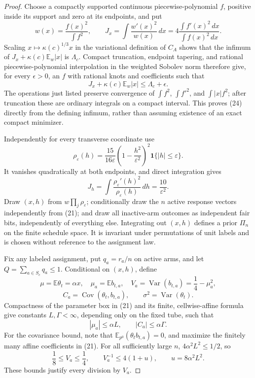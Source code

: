\documentclass{article}
\begin{document}
\begin{proof}
Choose a compactly supported continuous piecewise-polynomial \(f\), positive inside its support and zero at its endpoints, and put
\[
w(x)=\frac{f(x)^2}{\int f^2},
\qquad
J_x=\int\frac{w'(x)^2}{w(x)}\,dx
=4\frac{\int f'(x)^2\,dx}{\int f(x)^2\,dx}.
\]
Scaling \(x\mapsto\kappa(c)^{1/3}x\) in the variational definition of \(C_A\) shows that the infimum of \(J_x+\kappa(c)\mathbb E_w|x|\) is \(\Lambda_c\).  Compact truncation, endpoint tapering, and rational piecewise-polynomial interpolation in the weighted Sobolev norm therefore give, for every \(\epsilon>0\), an \(f\) with rational knots and coefficients such that
\[
J_x+\kappa(c)\mathbb E_w|x|\le\Lambda_c+\epsilon.
\tag{24}
\]
The operations just listed preserve convergence of \(\int f^2\), \(\int f'^2\), and \(\int|x|f^2\); after truncation these are ordinary integrals on a compact interval.  This proves (24) directly from the defining infimum, rather than assuming existence of an exact compact minimizer.

Independently for every transverse coordinate use
\[
\rho_\varepsilon(h)=\frac{15}{16\varepsilon}
\left(1-\frac{h^2}{\varepsilon^2}\right)^2
\mathbf1\{|h|\le\varepsilon\}.
\]
It vanishes quadratically at both endpoints, and direct integration gives
\[
J_h=\int\frac{\rho_\varepsilon'(h)^2}{\rho_\varepsilon(h)}\,dh
=\frac{10}{\varepsilon^2}.
\tag{25}
\]
Draw \((x,h)\) from \(w\prod_j\rho_\varepsilon\); conditionally draw the \(n\) active response vectors independently from (21); and draw all inactive-arm outcomes as independent fair bits, independently of everything else.  Integrating out \((x,h)\) defines a prior \(\Pi_n\) on the finite schedule space.  It is invariant under permutations of unit labels and is chosen without reference to the assignment law.

Fix any labeled assignment, put \(q_a=r_a/n\) on active arms, and let \(Q=\sum_{a\in S_c}q_a\le1\).  Conditional on \((x,h)\), define
\[
\mu=\mathbb E\theta_t=\alpha x,\quad
\mu_a=\mathbb Eb_{t,a},\quad
V_a=\operatorname{Var}(b_{t,a})=\frac14-\mu_a^2,
\]
\[
C_a=\operatorname{Cov}(\theta_t,b_{t,a}),
\qquad
\sigma^2=\operatorname{Var}(\theta_t).
\]
Compactness of the parameter box in (21) and its finite, cellwise-affine formula give constants \(L,\Gamma<\infty\), depending only on the fixed tube, such that
\[
|\mu_a|\le\alpha L,
\qquad
|C_a|\le\alpha\Gamma.
\tag{26}
\]
For the covariance bound, note that \(\mathbb E_{p^0}(\theta_tb_{t,a})=0\), and maximize the finitely many affine coefficients in (21).  For all sufficiently large \(n\), \(4\alpha^2L^2\le1/2\), so
\[
\frac18\le V_a\le\frac14,
\qquad
V_a^{-1}\le4(1+u),
\qquad
u=8\alpha^2L^2.
\tag{27}
\]
These bounds justify every division by \(V_a\).


\end{proof}
\end{document}
